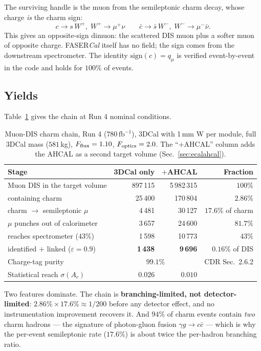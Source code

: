 \documentclass[11pt,a4paper]{article}
\newcommand{\fb}{\,\mathrm{fb}^{-1}}
\begin{document}
The surviving handle is the muon from the semileptonic charm decay, whose charge
\emph{is} the charm sign:
\begin{equation}
  c \to s\,W^+,\; W^+\!\to\mu^+\nu \qquad
  \bar{c} \to \bar{s}\,W^-,\; W^-\!\to\mu^-\bar{\nu}.
\end{equation}
This gives an opposite-sign dimuon: the scattered DIS muon plus a softer muon of
opposite charge. FASER\emph{Cal} itself has no field; the sign comes from the
downstream spectrometer. The identity $\mathrm{sign}(c)=q_\mu$ is verified
event-by-event in the code and holds for $100\%$ of events.

\subsection{Yields}
Table~\ref{tab:chain} gives the chain at Run 4 nominal conditions.

\begin{table}[htbp]
\centering\small
\begin{tabular}{lrrr}
\toprule
Stage & 3DCal only & $+$AHCAL & Fraction \\
\midrule
Muon DIS in the target volume & 897\,115 & 5\,982\,315 & $100\%$ \\
\quad containing charm & 25\,400 & 170\,804 & $2.86\%$ \\
\quad charm $\to$ semileptonic $\mu$ & 4\,481 & 30\,127 & $17.6\%$ of charm \\
\quad $\mu$ punches out of calorimeter & 3\,657 & 24\,600 & $81.7\%$ \\
\quad reaches spectrometer ($43\%$) & 1\,598 & 10\,773 & $43\%$ \\
\quad identified $+$ linked ($\varepsilon=0.9$) & \textbf{1\,438} & \textbf{9\,696} & $0.16\%$ of DIS \\
\midrule
Charge-tag purity & \multicolumn{2}{c}{$99.1\%$} & CDR Sec.~2.6.2 \\
Statistical reach $\sigma(A_c)$ & $0.026$ & $0.010$ & \\
\bottomrule
\end{tabular}
\caption{Muon-DIS charm chain, Run 4 ($780\fb$), 3DCal with 1\,mm W per module,
full 3DCal mass ($581\,$kg), $F_{\rm flux}=1.10$, $F_{\rm optics}=2.0$. The
``$+$AHCAL'' column adds the AHCAL as a second target volume
(Sec.~\ref{sec:ecalahcal}).}
\label{tab:chain}
\end{table}

Two features dominate. The chain is \textbf{branching-limited, not
detector-limited}: $2.86\%\times17.6\%\approx1/200$ before any detector effect,
and no instrumentation improvement recovers it. And $94\%$ of charm events
contain \emph{two} charm hadrons --- the signature of photon-gluon fusion
$\gamma g\to c\bar{c}$ --- which is why the per-event semileptonic rate
($17.6\%$) is about twice the per-hadron branching ratio.
\end{document}
